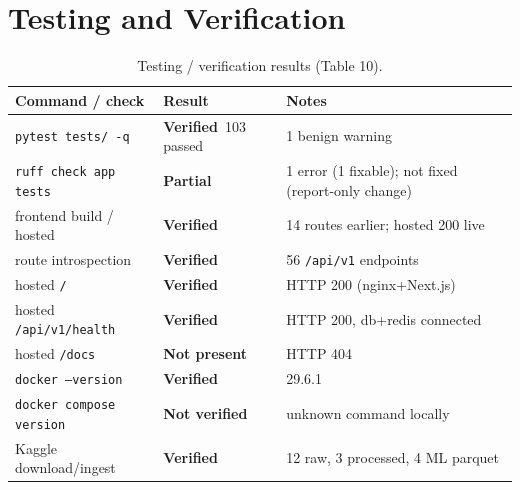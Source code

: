 \documentclass[11pt,a4paper]{article}
\newcommand{\stV}{\textcolor{cok}{\textbf{Verified}}}
\newcommand{\stP}{\textcolor{cpart}{\textbf{Partial}}}
\newcommand{\stNP}{\textcolor{cmiss}{\textbf{Not present}}}
\newcommand{\stNV}{\textcolor{cnv}{\textbf{Not verified}}}
\newcommand{\code}[1]{\texttt{\small #1}}
\begin{document}
\section{Testing and Verification}
\begin{table}[H]\centering\footnotesize
\caption{Testing / verification results (Table 10).}\label{tab:tests}
\begin{tabular}{@{}p{4.8cm}p{2.6cm}p{5.2cm}@{}}
\toprule
\textbf{Command / check} & \textbf{Result} & \textbf{Notes}\\
\midrule
\code{pytest tests/ -q} & \stV\ 103 passed & 1 benign warning\\
\code{ruff check app tests} & \stP & 1 error (1 fixable); not fixed (report-only change)\\
frontend build / hosted & \stV & 14 routes earlier; hosted 200 live\\
route introspection & \stV & 56 \code{/api/v1} endpoints\\
hosted \code{/} & \stV & HTTP 200 (nginx+Next.js)\\
hosted \code{/api/v1/health} & \stV & HTTP 200, db+redis connected\\
hosted \code{/docs} & \stNP & HTTP 404\\
\code{docker --version} & \stV & 29.6.1\\
\code{docker compose version} & \stNV & unknown command locally\\
Kaggle download/ingest & \stV & 12 raw, 3 processed, 4 ML parquet\\
\bottomrule
\end{tabular}
\end{table}

\end{document}
